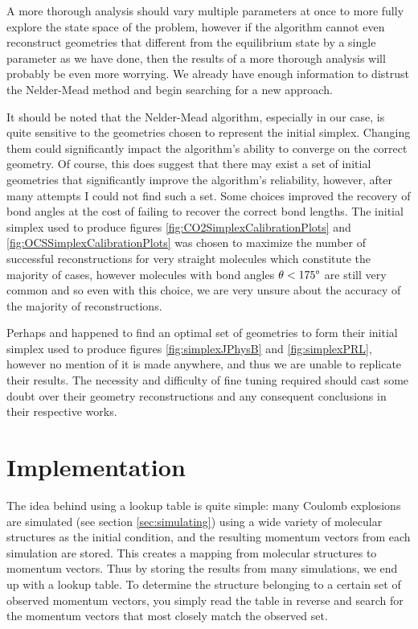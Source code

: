 A more thorough analysis should vary multiple parameters at once to more fully explore the state space of the problem, however if the algorithm cannot even reconstruct geometries that different from the equilibrium state by a single parameter as we have done, then the results of a more thorough analysis will probably be even more worrying. We already have enough information to distrust the Nelder-Mead method and begin searching for a new approach.

It should be noted that the Nelder-Mead algorithm, especially in our case, is quite sensitive to the geometries chosen to represent the initial simplex. Changing them could significantly impact the algorithm's ability to converge on the correct geometry. Of course, this does suggest that there may exist a set of initial geometries that significantly improve the algorithm's reliability, however, after many attempts I could not find such a set. Some choices improved the recovery of bond angles at the cost of failing to recover the correct bond lengths. The initial simplex used to produce figures \ref{fig:CO2SimplexCalibrationPlots} and \ref{fig:OCSSimplexCalibrationPlots} was chosen to maximize the number of successful reconstructions for very straight molecules which constitute the majority of cases, however molecules with bond angles $\theta < 175\degree$ are still very common and so even with this choice, we are very unsure about the accuracy of the majority of reconstructions.


Perhaps \citet{Brichta07} and \citet{Bocharova11} happened to find an optimal set of geometries to form their initial simplex used to produce figures \ref{fig:simplexJPhysB} and \ref{fig:simplexPRL}, however no mention of it is made anywhere, and thus we are unable to replicate their results. The necessity and difficulty of fine tuning required should cast some doubt over their geometry reconstructions and any consequent conclusions in their respective works.

\section{Implementation}
The idea behind using a lookup table is quite simple: many Coulomb explosions are simulated (see section \ref{sec:simulating}) using a wide variety of molecular structures as the initial condition, and the resulting momentum vectors from each simulation are stored. This creates a mapping from molecular structures to momentum vectors. Thus by storing the results from many simulations, we end up with a lookup table. To determine the structure belonging to a certain set of observed momentum vectors, you simply read the table in reverse and search for the momentum vectors that most closely match the observed set.

